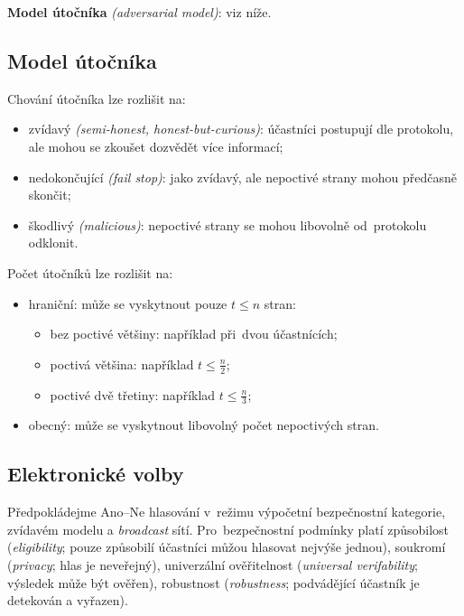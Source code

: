 \textbf{Model útočníka} \emph{(adversarial model)}: viz níže.


\subsection{Model útočníka}

Chování útočníka lze rozlišit na:
\begin{itemize}
\item zvídavý \emph{(semi-honest, honest-but-curious)}: účastníci postupují dle protokolu, ale mohou se zkoušet dozvědět více informací;
\item nedokončující \emph{(fail stop)}: jako zvídavý, ale nepoctivé strany mohou předčasně skončit;
\item škodlivý \emph{(malicious)}: nepoctivé strany se mohou libovolně od~protokolu odklonit.
\end{itemize}

Počet útočníků lze rozlišit na:
\begin{itemize}
\item hraniční: může se vyskytnout pouze $t \le n$ stran:
    \begin{itemize}
    \item bez poctivé většiny: například při~dvou účastnících;
    \item poctivá většina: například $t \le \frac{n}{2}$;
    \item poctivé dvě třetiny: například $t \le \frac{n}{3}$;
    \end{itemize}
\item obecný: může se vyskytnout libovolný počet nepoctivých stran.
\end{itemize}


\subsection{Elektronické volby}

Předpokládejme Ano--Ne hlasování v~režimu výpočetní bezpečnostní kategorie, zvídavém modelu a \emph{broadcast} sítí.
Pro~bezpečnostní podmínky platí způsobilost (\emph{eligibility}; pouze způsobilí účastníci můžou hlasovat nejvýše jednou), soukromí (\emph{privacy}; hlas je neveřejný), univerzální ověřitelnost (\emph{universal verifability}; výsledek může být ověřen), robustnost (\emph{robustness}; podvádějící účastník je detekován a vyřazen).

